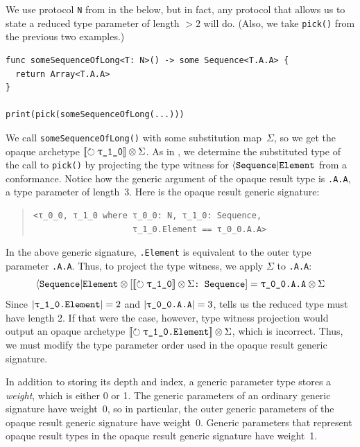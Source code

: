 \documentclass[../generics]{subfiles}
\begin{document}
\begin{example}
We use protocol \texttt{N} from  in the below, but in fact, any protocol that allows us to state a reduced type parameter of length $> 2$ will do. (Also, we take \texttt{pick()} from the previous two examples.)
\begin{Verbatim}
func someSequenceOfLong<T: N>() -> some Sequence<T.A.A> {
  return Array<T.A.A>
}

print(pick(someSequenceOfLong(...)))
\end{Verbatim}
We call \texttt{someSequenceOfLong()} with some substitution map~$\Sigma$, so we get the opaque archetype $\Oy \otimes \Sigma$. As in , we determine the substituted type of the call to \texttt{pick()} by projecting the type witness for $\langle\texttt{Sequence}|\texttt{Element}$ from a conformance. Notice how the generic argument of the opaque result type is \texttt{\rT.A.A}, a type parameter of length~3. Here is the opaque result generic signature:
\begin{quote}
\begin{verbatim}
<τ_0_0, τ_1_0 where τ_0_0: N, τ_1_0: Sequence,
                    τ_1_0.Element == τ_0_0.A.A>
\end{verbatim}
\end{quote}
In the above generic signature, \texttt{\rO.Element} is equivalent to the outer type parameter \texttt{\rT.A.A}. Thus, to project the type witness, we apply $\Sigma$ to \texttt{\rT.A.A}:
\[
\AElement \otimes \ConfReq{$\Oy \otimes \Sigma$}{Sequence} = \texttt{\rT.A.A} \otimes \Sigma
\]
Since $|\texttt{\rO.Element}|=2$ and $|\texttt{\rT.A.A}|=3$,  tells us the reduced type must have length 2. If that were the case, however, type witness projection would output an opaque archetype $\Opaque{\rO.Element} \otimes \Sigma$, which is incorrect. Thus, we must modify the type parameter order used in the opaque result generic signature.
\end{example}

\begin{definition}
In addition to storing its depth and index, a generic parameter type stores a \emph{weight}, which is either 0 or 1. The generic parameters of an ordinary generic signature have weight~0, so in particular, the outer generic parameters of the opaque result generic signature have weight~0. Generic parameters that represent opaque result types in the opaque result generic signature have weight~1.
\end{definition}
\end{document}
